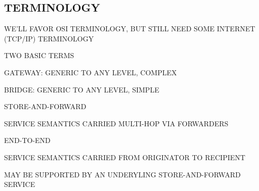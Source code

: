 \begin{bwslide}
\part*	{TERMINOLOGY}\bf

\begin{nrtc}
\item	WE'LL FAVOR OSI TERMINOLOGY, BUT STILL NEED SOME INTERNET (TCP/IP)
	TERMINOLOGY

\item	TWO BASIC TERMS
    \begin{nrtc}
    \item	GATEWAY: GENERIC TO ANY LEVEL, COMPLEX

    \item	BRIDGE: GENERIC TO ANY LEVEL, SIMPLE
    \end{nrtc}
\end{nrtc}
\end{bwslide}


\begin{bwslide}

\begin{nrtc}
\item	STORE-AND-FORWARD
    \begin{nrtc}
    \item	SERVICE SEMANTICS CARRIED MULTI-HOP VIA FORWARDERS
    \end{nrtc}

\item	END-TO-END
    \begin{nrtc}
    \item	SERVICE SEMANTICS CARRIED FROM ORIGINATOR TO RECIPIENT

    \item	MAY BE SUPPORTED BY AN UNDERYLING STORE-AND-FORWARD SERVICE
    \end{nrtc}
\end{nrtc}
\end{bwslide}




